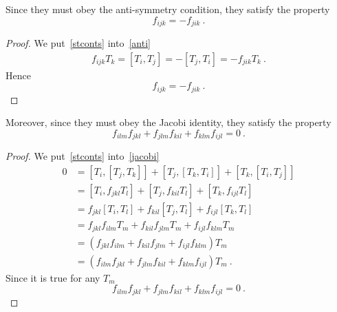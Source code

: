     Since they must obey the anti-symmetry condition, they satisfy the property 
    \begin{equation*}
        f_{ijk} = - f_{jik} ~.
    \end{equation*}

    \begin{proof}
        We put~\eqref{stconts} into~\eqref{anti}
        \begin{equation*}
        \begin{aligned}
            f_{ijk} T_k = [T_i, T_j] = - [T_j, T_i] = - f_{jik} T_k ~.
        \end{aligned}
        \end{equation*}
        Hence 
        \begin{equation*}
            f_{ijk} = - f_{jik} ~.
        \end{equation*}
    \end{proof}

    Moreover, since they must obey the Jacobi identity, they satisfy the property
    \begin{equation*}
        f_{ilm} f_{jkl} + f_{jlm} f_{kil} + f_{klm} f_{ijl} = 0 ~.
    \end{equation*}

    \begin{proof}
        We put~\eqref{stconts} into~\eqref{jacobi}
        \begin{equation*}
        \begin{aligned}
            0 & = [T_i, [T_j, T_k]] + [T_j, [T_k, T_i]] + [T_k, [T_i, T_j]] \\ & = [T_i, f_{jkl} T_l] + [T_j, f_{kil} T_l] + [T_k, f_{ijl} T_l] \\ & = f_{jkl} [T_i, T_l] + f_{kil} [T_j, T_l] + f_{ijl} [T_k, T_l] \\ & = f_{jkl} f_{ilm} T_m + f_{kil} f_{jlm} T_m + f_{ijl} f_{klm} T_m \\ & = (f_{jkl} f_{ilm} + f_{kil} f_{jlm}+ f_{ijl} f_{klm} ) T_m \\ & = (f_{ilm} f_{jkl} + f_{jlm} f_{kil} + f_{klm} f_{ijl}) T_m ~.
        \end{aligned}
        \end{equation*}
        Since it is true for any $T_m$
        \begin{equation*}
            f_{ilm} f_{jkl} + f_{jlm} f_{kil} + f_{klm} f_{ijl} = 0 ~.
        \end{equation*}
    \end{proof}


